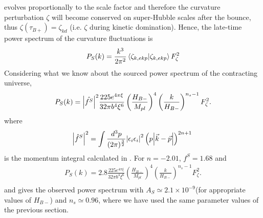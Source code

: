 \documentclass[12pt,a4paper]{article}
\numberwithin{equation}{section}
\numberwithin{equation}{section}
\begin{document}
evolves proportionally to the scale factor and therefore
the curvature perturbation $\zeta$ will become conserved on
super-Hubble scales after the bounce, thus $\zeta(\tau_{B+}) = \zeta_{kd}$ (i.e. $\zeta$ during kinetic domination). 
Hence, the late-time power spectrum of the curvature fluctuations is 
\begin{equation}
\begin{split}
    P_S(k) = \frac{k^3}{2\pi^2} \bra{\zeta_{k,ekp}}\ket{\zeta_{k,ekp}} F_{\zeta}^2\\
    \end{split}
\end{equation}
Considering what we know about the sourced power spectrum of the contracting universe,
\begin{equation}
\begin{split}
    P_S(k)  = \abs{\hat{f^S}}^2  \frac{225 e^{4\pi \xi}}{32 \pi b^4 \xi^6} \left(\frac{H_{B-}}{M_{pl}}\right)^4 \left(\frac{k}{H_{B-}}\right)^{n_s-1} F_{\zeta}^2.\\
    \label{e:finspec}
    \end{split}
\end{equation}
where 
\begin{equation}
\abs{\hat{f}^S}^2=\int \frac{d^3p}{(2\pi)^\frac{3}{2}}  \abs{\epsilon_i\epsilon_i}^2 \left(p\abs{\vec{k}-\vec{p}}\right)^{2n+1}\\
\end{equation}
is the momentum integral calculated in \cite{r4}. For $n=-2.01$, $f^S=1.68$ and 
\begin{equation}
\begin{split}
    P_S(k)  = 2.8  \frac{225 e^{4\pi \xi}}{32 \pi b^4 \xi^6} \left(\frac{H_{B-}}{M_{pl}}\right)^4 \left(\frac{k}{H_{B-}}\right)^{n_s-1} F_{\zeta}^2.\\
    \label{e:finspec1}
    \end{split}
\end{equation}
and gives the observed power spectrum with $A_S\simeq2.1\times 10^{-9}$(for appropriate values of $H_{B-}$) and $n_s\simeq0.96$, where we have used the same parameter values of the previous section.
\end{document}
